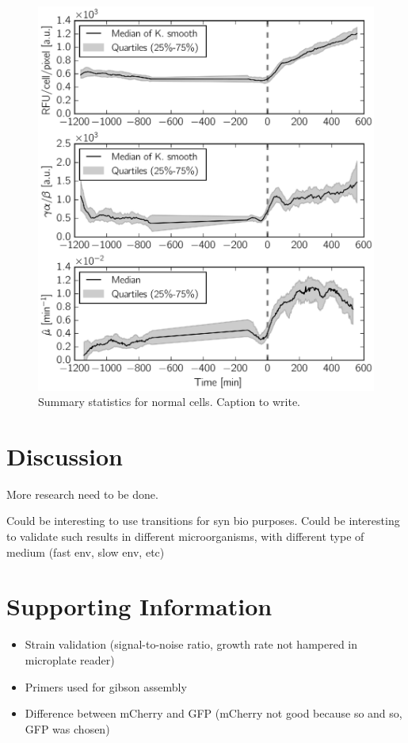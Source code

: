 \begin{figure}[h!]
\centering
\includegraphics[scale=1]{./Fig/gene_activity_median}
\caption{Summary statistics for normal cells. Caption to write.}
\label{fig:gene_activity_median}
\end{figure}


\section{Discussion}

More research need to be done.

Could be interesting to use transitions for syn bio purposes.
Could be interesting to validate such results in different microorganisms, with different type of medium (fast env, slow env, etc)

\section{Supporting Information}

\begin{itemize}
\item Strain validation (signal-to-noise ratio, growth rate not hampered in microplate reader)
\item Primers used for gibson assembly
\item Difference between mCherry and GFP (mCherry not good because so and so, GFP was chosen)
\end{itemize}